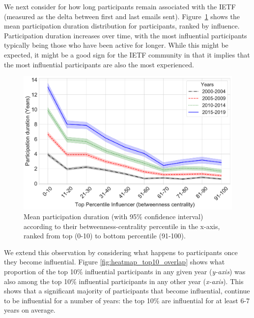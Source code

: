 \documentclass[twocolumn,10pt]{article}
\newlength{\figureWidthOneColumn}
\newcommand{\pb}[1]{\vspace{0.75ex}\noindent{\textbf{#1}}}
\begin{document}
\pb{Participation duration}
We next consider for how long participants remain associated with the IETF
(measured as the delta between first and last emails sent).
Figure~\ref{fig:age_top_percentile} shows the mean participation duration
distribution for participants, ranked by influence.  Participation duration
increases over time, with the most influential participants typically being
those who have been active for longer. While this might be expected, it
might be a good sign for the IETF community in that it implies that the
most influential participants are also the most experienced.

\begin{figure}
  \centering
  \includegraphics[width=\figureWidthOneColumn]{figures-prev/icwsm-2022/lineplot_age_top_percentile.pdf}
  \caption{
    Mean participation duration (with 95\% confidence interval) according
    to their betweenness-centrality percentile in the x-axis, ranked from
    top (0-10) to bottom percentile (91-100).
  }
  \label{fig:age_top_percentile}
\end{figure}

We extend this observation by considering what happens to participants once
they become influential. Figure \ref{fig:heatmap_top10_overlap} shows what
proportion of the top 10\% influential participants in any given year
(\emph{y-axis}) was also among the top 10\% influential participants in any
other year (\emph{x-axis}). This shows that a significant majority of
participants that become influential, continue to be influential for a
number of years: the top 10\% are influential for at least 6-7 years on
average.
\end{document}
